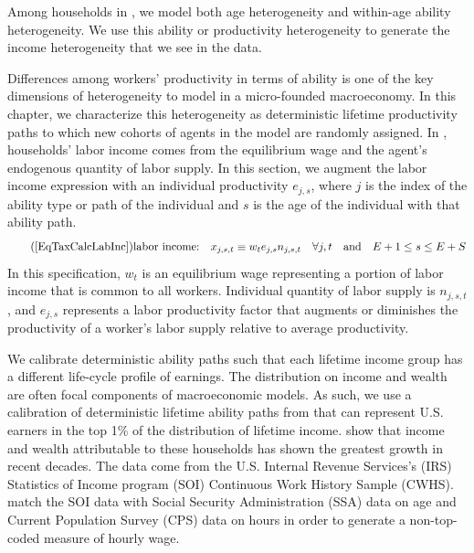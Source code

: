 
Among households in \ogindia, we model both age heterogeneity and within-age ability heterogeneity. We use this ability or productivity heterogeneity to generate the income heterogeneity that we see in the data.

Differences among workers' productivity in terms of ability is one of the key dimensions of heterogeneity to model in a micro-founded macroeconomy. In this chapter, we characterize this heterogeneity as deterministic lifetime productivity paths to which new cohorts of agents in the model are randomly assigned. In \ogindia, households' labor income comes from the equilibrium wage and the agent's endogenous quantity of labor supply. In this section, we augment the labor income expression with an individual productivity $e_{j,s}$, where $j$ is the index of the ability type or path of the individual and $s$ is the age of the individual with that ability path.
\begin{equation}\tag{\ref{EqTaxCalcLabInc}}
  \text{labor income:}\quad x_{j,s,t}\equiv w_t e_{j,s}n_{j,s,t} \quad\forall j,t \quad\text{and}\quad E+1\leq s\leq E+S
\end{equation}
In this specification, $w_t$ is an equilibrium wage representing a portion of labor income that is common to all workers. Individual quantity of labor supply is $n_{j,s,t}$, and $e_{j,s}$ represents a labor productivity factor that augments or diminishes the productivity of a worker's labor supply relative to average productivity.

We calibrate deterministic ability paths such that each lifetime income group has a different life-cycle profile of earnings. The distribution on income and wealth are often focal components of macroeconomic models. As such, we use a calibration of deterministic lifetime ability paths from \citet{DeBackerEtAl:2017b} that can represent U.S. earners in the top 1\% of the distribution of lifetime income. \citet{PikettySaez:2003} show that income and wealth attributable to these households has shown the greatest growth in recent decades. The data come from the U.S. Internal Revenue Services's (IRS) Statistics of Income program (SOI) Continuous Work History Sample (CWHS). \citet{DeBackerEtAl:2017b} match the SOI data with Social Security Administration (SSA) data on age and Current Population Survey (CPS) data on hours in order to generate a non-top-coded measure of hourly wage.

